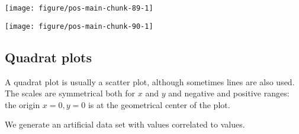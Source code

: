 \documentclass[krantz2]{krantz}\usepackage{knitr}%
\begin{document}
\begin{knitrout}\footnotesize
{}\color{fgcolor}\begin{kframe}
\begin{alltt}
    \hlopt{+}
  \hlstd{(} \hlstd{=} \hlstd{)} \hlopt{+}
  \hlstd{()}
\end{alltt}
\end{kframe}

{\centering \texttt{[image: figure/pos-main-chunk-89-1]} 

}



\end{knitrout}

\begin{knitrout}\footnotesize
{}\color{fgcolor}\begin{kframe}
\begin{alltt}
    \hlopt{+}
  \hlstd{(} \hlstd{=} \hlstd{)} \hlopt{+}
  \hlstd{(} \hlstd{=} \hlstd{,}  \hlstd{=} \hlstd{,}
   \hlstd{=} \hlstd{)}
\end{alltt}
\end{kframe}

{\centering \texttt{[image: figure/pos-main-chunk-90-1]} 

}



\end{knitrout}

\subsection{Quadrat plots}

A quadrat plot is usually a scatter plot, although sometimes lines are also used. The scales are symmetrical both for $x$ and $y$ and negative and positive ranges: the origin $x = 0, y = 0$ is at the geometrical center of the plot.

We generate an artificial data set with  values correlated to  values.
\end{document}
